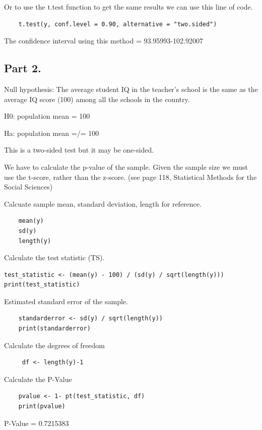 \documentclass[12pt,letterpaper]{article}
\begin{document}
	Or to use the t.test function to get the same results we can use this line of code.
	\begin{verbatim}
	t.test(y, conf.level = 0.90, alternative = "two.sided")
    \end{verbatim}
The confidence interval using this method = 93.95993-102.92007
\vspace{10mm}

\subsection*{Part 2.}

Null hypothesis: The average student IQ in the teacher's school is the same as the average IQ score (100) among all the schools in the country.
\vspace{5mm}

H0: population mean = 100
\vspace{1mm}

Ha: population mean =/= 100
\vspace{1mm}

This is a two-sided test but it may be one-sided.
\vspace{5mm}

We have to calculate the p-value of the sample. Given the sample size we must use the t-score, rather than the z-score. (see page 118, Statistical Methods for the Social Sciences)
\vspace{5mm}

Calcuate sample mean, standard deviation, length for reference.
\begin{verbatim}
	mean(y)
	sd(y)
	length(y)
\end{verbatim}

Calculate the test statistic (TS).
\begin{Verbatim}
test_statistic <- (mean(y) - 100) / (sd(y) / sqrt(length(y)))
print(test_statistic)
\end{Verbatim}
Estimated standard error of the sample.
\begin{Verbatim}
	standarderror <- sd(y) / sqrt(length(y))
	print(standarderror)
\end{Verbatim}
Calculate the degrees of freedom
\begin{Verbatim}
     df <- length(y)-1
\end{Verbatim}
Calculate the P-Value
\begin{Verbatim}
	pvalue <- 1- pt(test_statistic, df)
	print(pvalue)
\end{Verbatim}
P-Value = 0.7215383
\end{document}
